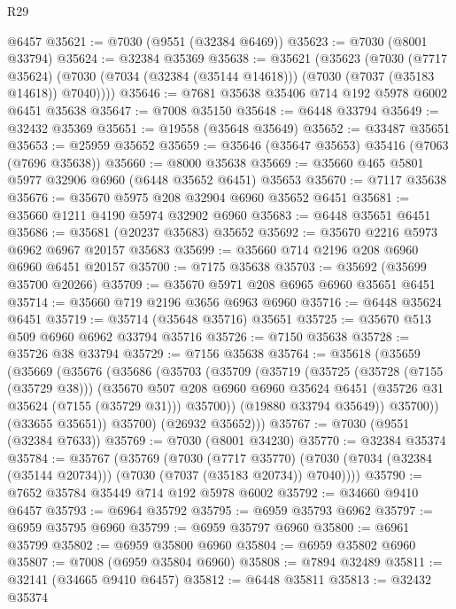 \begin{lexlean}{R29}
\begin{coremodule}
    @6457
@35621 := @7030 (@9551 (@32384 @6469))
@35623 := @7030 (@8001 @33794)
@35624 := @32384 @35369
@35638 := @35621
    (@35623
      (@7030
        (@7717 @35624)
        (@7030 (@7034 (@32384 (@35144 @14618))) (@7030 (@7037 (@35183 @14618)) @7040))))
@35646 := @7681 @35638 @35406 @714 @192 @5978 @6002 @6451 @35638
@35647 := @7008 @35150
@35648 := @6448 @33794
@35649 := @32432 @35369
@35651 := @19558 (@35648 @35649)
@35652 := @33487 @35651
@35653 := @25959 @35652
@35659 := @35646 (@35647 @35653) @35416 (@7063 (@7696 @35638))
@35660 := @8000 @35638
@35669 := @35660 @465 @5801 @5977 @32906 @6960 (@6448 @35652 @6451) @35653
@35670 := @7117 @35638
@35676 := @35670 @5975 @208 @32904 @6960 @35652 @6451
@35681 := @35660 @1211 @4190 @5974 @32902 @6960
@35683 := @6448 @35651 @6451
@35686 := @35681 (@20237 @35683) @35652
@35692 := @35670 @2216 @5973 @6962 @6967 @20157 @35683
@35699 := @35660 @714 @2196 @208 @6960 @6960 @6451 @20157
@35700 := @7175 @35638
@35703 := @35692 (@35699 @35700 @20266)
@35709 := @35670 @5971 @208 @6965 @6960 @35651 @6451
@35714 := @35660 @719 @2196 @3656 @6963 @6960
@35716 := @6448 @35624 @6451
@35719 := @35714 (@35648 @35716) @35651
@35725 := @35670 @513 @509 @6960 @6962 @33794 @35716
@35726 := @7150 @35638
@35728 := @35726 @38 @33794
@35729 := @7156 @35638
@35764 := @35618
    (@35659
      (@35669
        (@35676
          (@35686
            (@35703
              (@35709
                (@35719
                  (@35725
                    (@35728 (@7155 (@35729 @38)))
                    (@35670
                      @507
                      @208
                      @6960
                      @6960
                      @35624
                      @6451
                      (@35726 @31 @35624 (@7155 (@35729 @31)))
                      @35700))
                  (@19880 @33794 @35649))
                @35700))
            (@33655 @35651))
          @35700)
        (@26932 @35652)))
@35767 := @7030 (@9551 (@32384 @7633))
@35769 := @7030 (@8001 @34230)
@35770 := @32384 @35374
@35784 := @35767
    (@35769
      (@7030
        (@7717 @35770)
        (@7030 (@7034 (@32384 (@35144 @20734))) (@7030 (@7037 (@35183 @20734)) @7040))))
@35790 := @7652 @35784 @35449 @714 @192 @5978 @6002
@35792 := @34660 @9410 @6457
@35793 := @6964 @35792
@35795 := @6959 @35793 @6962
@35797 := @6959 @35795 @6960
@35799 := @6959 @35797 @6960
@35800 := @6961 @35799
@35802 := @6959 @35800 @6960
@35804 := @6959 @35802 @6960
@35807 := @7008 (@6959 @35804 @6960)
@35808 := @7894 @32489
@35811 := @32141 (@34665 @9410 @6457)
@35812 := @6448 @35811
@35813 := @32432 @35374

\end{coremodule}
\end{lexlean}

